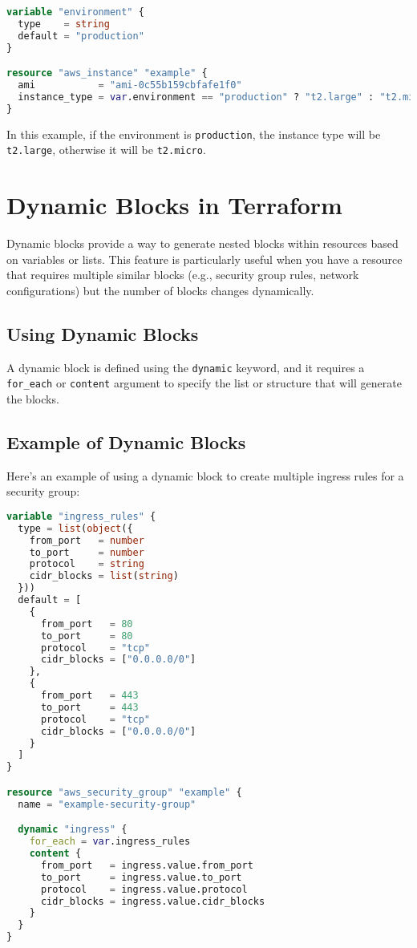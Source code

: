 \begin{lstlisting}[language=terraform]
variable "environment" {
  type    = string
  default = "production"
}

resource "aws_instance" "example" {
  ami           = "ami-0c55b159cbfafe1f0"
  instance_type = var.environment == "production" ? "t2.large" : "t2.micro"
}
\end{lstlisting}

In this example, if the environment is \texttt{production}, the instance type will be \texttt{t2.large}, otherwise it will be \texttt{t2.micro}.

\section{Dynamic Blocks in Terraform}

Dynamic blocks provide a way to generate nested blocks within resources based on variables or lists. This feature is particularly useful when you have a resource that requires multiple similar blocks (e.g., security group rules, network configurations) but the number of blocks changes dynamically.

\subsection{Using Dynamic Blocks}

A dynamic block is defined using the \texttt{dynamic} keyword, and it requires a \texttt{for\_each} or \texttt{content} argument to specify the list or structure that will generate the blocks.

\subsection{Example of Dynamic Blocks}

Here's an example of using a dynamic block to create multiple ingress rules for a security group:

\begin{lstlisting}[language=terraform]
variable "ingress_rules" {
  type = list(object({
    from_port   = number
    to_port     = number
    protocol    = string
    cidr_blocks = list(string)
  }))
  default = [
    {
      from_port   = 80
      to_port     = 80
      protocol    = "tcp"
      cidr_blocks = ["0.0.0.0/0"]
    },
    {
      from_port   = 443
      to_port     = 443
      protocol    = "tcp"
      cidr_blocks = ["0.0.0.0/0"]
    }
  ]
}

resource "aws_security_group" "example" {
  name = "example-security-group"

  dynamic "ingress" {
    for_each = var.ingress_rules
    content {
      from_port   = ingress.value.from_port
      to_port     = ingress.value.to_port
      protocol    = ingress.value.protocol
      cidr_blocks = ingress.value.cidr_blocks
    }
  }
}
\end{lstlisting}


